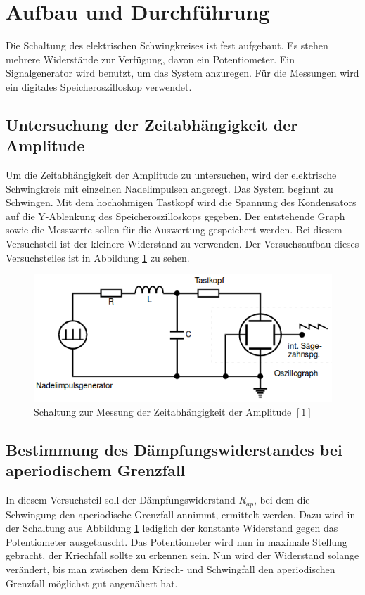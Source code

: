 \documentclass[11pt,ngerman,a4paper]{article}
\begin{document}
\section{Aufbau und Durchf\"{u}hrung}
Die Schaltung des elektrischen Schwingkreises ist fest aufgebaut. Es stehen mehrere Widerstände zur Verfügung, davon ein Potentiometer. Ein Signalgenerator wird benutzt, um das System anzuregen. Für die Messungen wird ein digitales Speicheroszilloskop verwendet.
\subsection{Untersuchung der Zeitabhängigkeit der Amplitude}
Um die Zeitabhängigkeit der Amplitude zu untersuchen, wird der elektrische Schwingkreis mit einzelnen Nadelimpulsen angeregt. Das System beginnt zu Schwingen. Mit dem hochohmigen Tastkopf wird die Spannung des Kondensators auf die Y-Ablenkung des Speicheroszilloskops gegeben. Der entstehende Graph sowie die Messwerte sollen für die Auswertung gespeichert werden. Bei diesem Versuchsteil ist der kleinere Widerstand zu verwenden. Der Versuchsaufbau dieses Versuchsteiles ist in Abbildung \ref{S1} zu sehen.
\begin{figure}[h]
\centering
\includegraphics[scale=0.7]{Aufbau1.png}
\caption{Schaltung zur Messung der Zeitabhängigkeit der Amplitude $[1]$}
\label{S1}
\end{figure}
\subsection{Bestimmung des Dämpfungswiderstandes bei aperiodischem Grenzfall}
In diesem Versuchsteil soll der Dämpfungswiderstand $R_{ap}$, bei dem die Schwingung den aperiodische Grenzfall annimmt, ermittelt werden. Dazu wird in der Schaltung aus Abbildung \ref{S1} lediglich der konstante Widerstand gegen das Potentiometer ausgetauscht. Das Potentiometer wird nun in maximale Stellung gebracht, der Kriechfall sollte zu erkennen sein. Nun wird der Widerstand solange verändert, bis man zwischen dem Kriech- und Schwingfall den aperiodischen Grenzfall möglichst gut angenähert hat.
\end{document}
